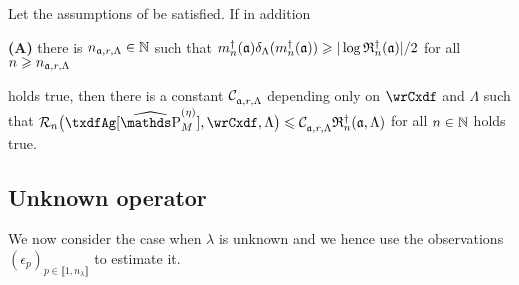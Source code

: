 \begin{cor}
  Let the assumptions of  be satisfied.  If in
  addition
  \begin{inparaenum}\item[{{\dgrau\bfseries(A)}}]
    there is $\ssY_{\xdfCw[],\xdfCr,\Lambda}\in\Nz$  such that
    $\aDi{\ssY}({\xdfCw[]})\cmSv[\aDi{\ssY}({\xdfCw[]})]\geq \vert \log\naRa{(\xdfCw[])} \vert/2 $
    for all $\ssY\geq \ssY_{\xdfCw[],\xdfCr,\Lambda}$
  \end{inparaenum}
  holds true, then there is a constant $\cst{\xdfCw[],\xdfCr,\Lambda}$
  depending only on $\rwCxdf$ and $\Lambda$ such that
  $ \nRi{\txdfAg[{\erWe[]}]}{\rwCxdf,\Lambda} \leq
  \cst{\xdfCw[],\xdfCr,\Lambda}\naRa{(\xdfCw[],\Lambda)}$ for all $n\in\Nz$
  holds true.
  \reEnd
\end{cor}


\subsection{Unknown operator}\label{freq:igssm:uk}
We now consider the case when $\lambda$ is unknown and we hence use the observations $(\epsilon_{p})_{p \in \llbracket 1, n_{\lambda} \rrbracket}$ to estimate it.
